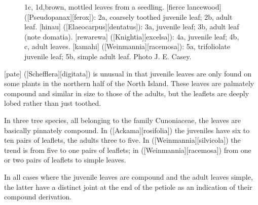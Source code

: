 \begin{figure}[!t]
\begin{minipage}[t]{\textwidth}
\begin{minipage}[t]{(\textwidth-\fgap) * \real{0.476}}
{			1c, 1d,brown, mottled leaves from a seedling.
			[fierce lancewood] ([Pseudopanax][ferox]):
			2a, coarsely toothed juvenile leaf;
			2b, adult leaf.
			[hinau] ([Elaeocarpus][dentatus]):
			3a, juvenile leaf;
			3b, adult leaf (note domatia).
			[rewarewa] ([Knightia][excelsa]):
			4a, juvenile leaf;
			4b, c, adult leaves.
			 ([Weinmannia][racemosa]):
			5a, trifoliolate juvenile leaf;
			5b, simple adult leaf.
			Photo  J. E. Casey.}%
			\label{fig:19leaves}
		\end{minipage}
	\end{minipage}
\end{figure}

[pate] ([Schefflera][digitata]) is unusual in that juvenile leaves are only found on some plants in the northern half of the North Island.
These leaves are palmately compound and similar in size to those of the adults, but the leaflets are deeply lobed rather than just toothed.

In three tree species, all belonging to the family Cunoniaceae, the leaves are basically pinnately compound.
In  ([Ackama][rosifolia]) the juveniles have six to ten pairs of leaflets, the adults three to five.
In  ([Weinmannia][silvicola]) the trend is from five to one pairs of leaflets; in  ([Weinmannia][racemosa]) from one or two pairs of leaflets to simple leaves.

In all cases where the juvenile leaves are compound and the adult leaves simple, the latter have a distinct joint at the end of the petiole as an indication of their compound derivation.

